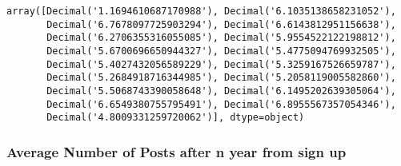 \documentclass[
  letterpaper,
  DIV=11,
  numbers=noendperiod]{scrartcl}
\begin{document}
\begin{verbatim}
array([Decimal('1.1694610687170988'), Decimal('6.1035138658231052'),
       Decimal('6.7678097725903294'), Decimal('6.6143812951156638'),
       Decimal('6.2706355316055085'), Decimal('5.9554522122198812'),
       Decimal('5.6700696650944327'), Decimal('5.4775094769932505'),
       Decimal('5.4027432056589229'), Decimal('5.3259167526659787'),
       Decimal('5.2684918716344985'), Decimal('5.2058119005582860'),
       Decimal('5.5068743390058648'), Decimal('6.1495202639305064'),
       Decimal('6.6549380755795491'), Decimal('6.8955567357054346'),
       Decimal('4.8009331259720062')], dtype=object)
\end{verbatim}

\subsubsection{Average Number of Posts after n year from sign
up}\label{average-number-of-posts-after-n-year-from-sign-up}
\end{document}

